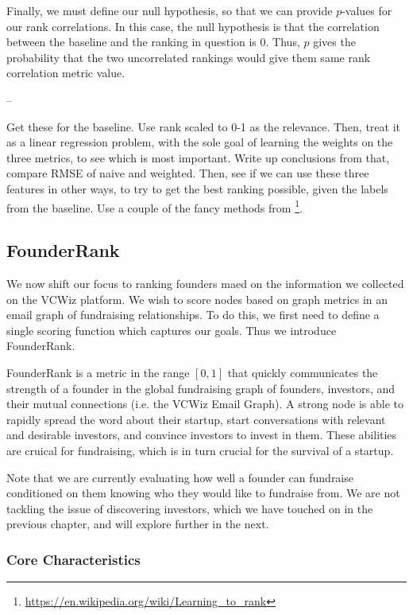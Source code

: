Finally, we must define our null hypothesis, so that we can provide $p$-values for our rank correlations. In this case, the null hypothesis is that the correlation between the baseline and the ranking in question is 0. Thus, $p$ gives the probability that the two uncorrelated rankings would give them same rank correlation metric value.

--

Get these for the baseline. Use rank scaled to 0-1 as the relevance.
Then, treat it as a linear regression problem, with the sole goal of learning the weights on the three metrics, to see which is most important. Write up conclusions from that, compare RMSE of naive and weighted.
Then, see if we can use these three features in other ways, to try to get the best ranking possible, given the labels from the baseline. Use a couple of the fancy methods from \footnote{\url{https://en.wikipedia.org/wiki/Learning_to_rank}}.

\subsection{FounderRank}

We now shift our focus to ranking founders maed on the information we collected on the VCWiz platform. We wish to score nodes based on graph metrics in an email graph of fundraising relationships. To do this, we first need to define a single scoring function which captures our goals. Thus we introduce FounderRank.

FounderRank is a metric in the range $[0, 1]$ that quickly communicates the strength of a founder in the global fundraising graph of founders, investors, and their mutual connections (i.e. the VCWiz Email Graph). A strong node is able to rapidly spread the word about their startup, start conversations with relevant and desirable investors, and convince investors to invest in them. These abilities are cruical for fundraising, which is in turn crucial for the survival of a startup.

Note that we are currently evaluating how well a founder can fundraise conditioned on them knowing who they would like to fundraise from. We are not tackling the issue of discovering investors, which we have touched on in the previous chapter, and will explore further in the next.

\subsubsection{Core Characteristics}

